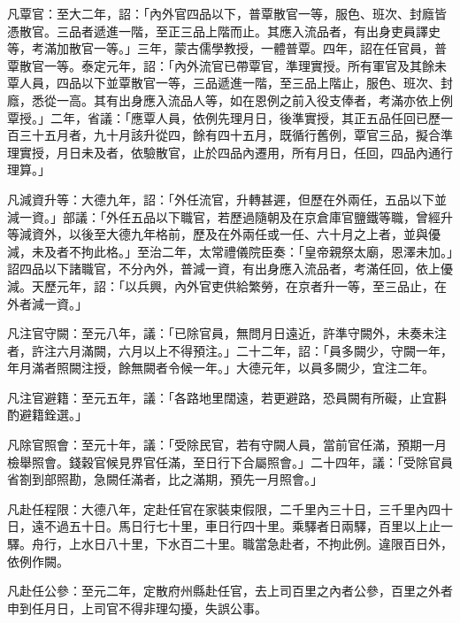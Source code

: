 \begin{pinyinscope}
 凡覃官：至大二年，詔：「內外官四品以下，普覃散官一等，服色、班次、封廕皆憑散官。三品者遞進一階，至正三品上階而止。其應入流品者，有出身吏員譯史等，考滿加散官一等。」三年，蒙古儒學教授，一體普覃。四年，詔在任官員，普覃散官一等。泰定元年，詔：「內外流官已帶覃官，準理實授。所有軍官及其餘未覃人員，四品以下並覃散官一等，三品遞進一階，至三品上階止，服色、班次、封廕，悉從一高。其有出身應入流品人等，如在恩例之前入役支俸者，考滿亦依上例覃授。」二年，省議：「應覃人員，依例先理月日，後準實授，其正五品任回已歷一百三十五月者，九十月該升從四，餘有四十五月，既循行舊例，覃官三品，擬合準理實授，月日未及者，依驗散官，止於四品內遷用，所有月日，任回，四品內通行理算。」



 凡減資升等：大德九年，詔：「外任流官，升轉甚遲，但歷在外兩任，五品以下並減一資。」部議：「外任五品以下職官，若歷過隨朝及在京倉庫官鹽鐵等職，曾經升等減資外，以後至大德九年格前，歷及在外兩任或一任、六十月之上者，並與優減，未及者不拘此格。」至治二年，太常禮儀院臣奏：「皇帝親祭太廟，恩澤未加。」詔四品以下諸職官，不分內外，普減一資，有出身應入流品者，考滿任回，依上優減。天歷元年，詔：「以兵興，內外官吏供給繁勞，在京者升一等，至三品止，在外者減一資。」



 凡注官守闕：至元八年，議：「已除官員，無問月日遠近，許準守闕外，未奏未注者，許注六月滿闕，六月以上不得預注。」二十二年，詔：「員多闕少，守闕一年，年月滿者照闕注授，餘無闕者令候一年。」大德元年，以員多闕少，宜注二年。



 凡注官避籍：至元五年，議：「各路地里闊遠，若更避路，恐員闕有所礙，止宜斟酌避籍銓選。」



 凡除官照會：至元十年，議：「受除民官，若有守闕人員，當前官任滿，預期一月檢舉照會。錢穀官候見界官任滿，至日行下合屬照會。」二十四年，議：「受除官員省劄到部照勘，急闕任滿者，比之滿期，預先一月照會。」



 凡赴任程限：大德八年，定赴任官在家裝束假限，二千里內三十日，三千里內四十日，遠不過五十日。馬日行七十里，車日行四十里。乘驛者日兩驛，百里以上止一驛。舟行，上水日八十里，下水百二十里。職當急赴者，不拘此例。違限百日外，依例作闕。



 凡赴任公參：至元二年，定散府州縣赴任官，去上司百里之內者公參，百里之外者申到任月日，上司官不得非理勾擾，失誤公事。




\end{pinyinscope}

